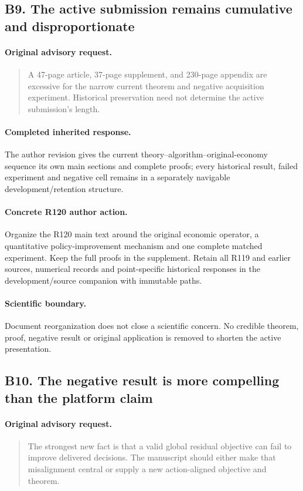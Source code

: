 \subsection{B9. The active submission remains cumulative and disproportionate}
\label{response120:B9}
\paragraph{Original advisory request.}
\begin{quote}
A 47-page article, 37-page supplement, and 230-page appendix are excessive for the narrow current theorem and negative acquisition experiment. Historical preservation need not determine the active submission's length.
\end{quote}
\paragraph{Completed inherited response.}
The author revision gives the current theory--algorithm--original-economy sequence its own main sections and complete proofs; every historical result, failed experiment and negative cell remains in a separately navigable development/retention structure.
\paragraph{Concrete R120 author action.}
Organize the R120 main text around the original economic operator, a quantitative policy-improvement mechanism and one complete matched experiment. Keep the full proofs in the supplement. Retain all R119 and earlier sources, numerical records and point-specific historical responses in the development/source companion with immutable paths.
\paragraph{Scientific boundary.}
Document reorganization does not close a scientific concern. No credible theorem, proof, negative result or original application is removed to shorten the active presentation.

\subsection{B10. The negative result is more compelling than the platform claim}
\label{response120:B10}
\paragraph{Original advisory request.}
\begin{quote}
The strongest new fact is that a valid global residual objective can fail to improve delivered decisions. The manuscript should either make that misalignment central or supply a new action-aligned objective and theorem.
\end{quote}
